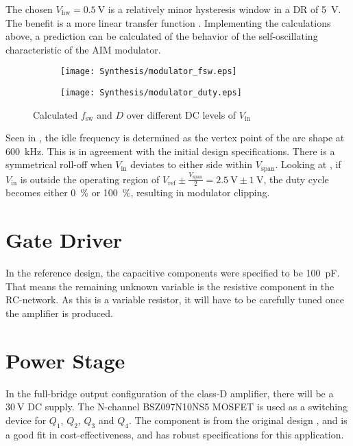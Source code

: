 The chosen $V_{\mathrm{hw}} = \SI{0.5}{\volt}$ is a relatively minor hysteresis window in a DR of \SI{5}{\volt}. The benefit is a more linear transfer function \cite{multivar_ctrl_loops_for_SM_audio_systems}. Implementing the calculations above, a prediction can be calculated of the behavior of the self-oscillating characteristic of the AIM modulator.

\begin{figure}[htbp]
	\centering
	\begin{subfigure}[t]{0.4\textwidth}
		\texttt{[image: Synthesis/modulator\_fsw.eps]}
		\label{fig:modulator_fsw_synth}
	\end{subfigure}%
	\begin{subfigure}[t]{0.4\textwidth}
		\texttt{[image: Synthesis/modulator\_duty.eps]}
		\label{fig:modulator_duty_synth}
	\end{subfigure}
	\caption{Calculated $f_{\mathrm{sw}}$ and $D$ over different DC levels of $V_{\mathrm{in}}$}
	\label{fig:modulator_fsw_duty_synth}
\end{figure}

Seen in , the idle frequency is determined as the vertex point of the arc shape at \SI{600}{\kilo\hertz}. This is in agreement with the initial design specifications. There is a symmetrical roll-off when $V_{\mathrm{in}}$ deviates to either side within $V_{\mathrm{span}}$. Looking at , if $V_{\mathrm{in}}$ is outside the operating region of $V_{\mathrm{ref}}\pm\frac{V_{\mathrm{span}}}{2}=\SI{2.5}{\volt}\pm\SI{1}{\volt}$, the duty cycle becomes either \SI{0}{\percent} or \SI{100}{\percent}, resulting in modulator clipping. 

\section{Gate Driver}
In the reference design, the capacitive components were specified to be \SI{100}{\pico\farad}. That means the remaining unknown variable is the resistive component in the RC-network. As this is a variable resistor, it will have to be carefully tuned once the amplifier is produced.

\section{Power Stage}
In the full-bridge output configuration of the class-D amplifier, there will be a $\SI{30}{\volt}$ DC supply. The N-channel BSZ097N10NS5 \cite{BSZ097N10NS5} MOSFET is used as a switching device for $Q_{1}$, $Q_{2}$, $Q_{3}$ and $Q_{4}$. The component is from the original design \cite{nagy_special_course}, and is a good fit in cost-effectiveness, and has robust specifications for this application.

